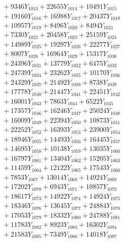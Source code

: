 \documentclass[a4paper,10pt]{article}
\begin{document}
{\begin{align}
&\;  + 9346 Y_{1013} + 22655 Y_{1014} + 10491 Y_{1015} \\[0.3ex]
&\;  + 19160 Y_{1016} + 16988 Y_{1017} + 20437 Y_{1018} \\[0.5ex]\allowbreak
&\;  + 10957 Y_{1019} + 8496 Y_{1020} + 8494 Y_{1021} \\[0.3ex]
&\;  + 7330 Y_{1022} + 20458 Y_{1023} + 25159 Y_{1024} \\[0.3ex]
&\;  + 14989 Y_{1025} + 19297 Y_{1026} + 22277 Y_{1027} \\[0.3ex]
&\;  + 8007 Y_{1028} + 16964 Y_{1029} + 15317 Y_{1030} \\[0.3ex]
&\;  + 24396 Y_{1031} + 13779 Y_{1032} + 6475 Y_{1033} \\[0.3ex]
&\;  + 24739 Y_{1034} + 23262 Y_{1035} + 10170 Y_{1036} \\[0.3ex]
&\;  + 24329 Y_{1037} + 21492 Y_{1038} + 8738 Y_{1039} \\[0.3ex]
&\;  + 17778 Y_{1040} + 21447 Y_{1041} + 22451 Y_{1042} \\[0.3ex]
&\;  + 16001 Y_{1043} + 7863 Y_{1044} + 6522 Y_{1045} \\[0.3ex]
&\;  + 17357 Y_{1046} + 16246 Y_{1047} + 25024 Y_{1048} \\[0.5ex]\allowbreak
&\;  + 16009 Y_{1049} + 22394 Y_{1050} + 10873 Y_{1051} \\[0.3ex]
&\;  + 22252 Y_{1052} + 16393 Y_{1053} + 23900 Y_{1054} \\[0.3ex]
&\;  + 18946 Y_{1055} + 14493 Y_{1056} + 16445 Y_{1057} \\[0.3ex]
&\;  + 14695 Y_{1058} + 10138 Y_{1059} + 13035 Y_{1060} \\[0.3ex]
&\;  + 16797 Y_{1061} + 13404 Y_{1062} + 15205 Y_{1063} \\[0.3ex]
&\;  + 11459 Y_{1064} + 12122 Y_{1065} + 17543 Y_{1066} \\[0.3ex]
&\;  + 7853 Y_{1067} + 13014 Y_{1068} + 14924 Y_{1069} \\[0.3ex]
&\;  + 17202 Y_{1070} + 6943 Y_{1071} + 10857 Y_{1072} \\[0.3ex]
&\;  + 18617 Y_{1073} + 14922 Y_{1074} + 14924 Y_{1075} \\[0.3ex]
&\;  + 18346 Y_{1076} + 13645 Y_{1077} + 24884 Y_{1078} \\[0.5ex]\allowbreak
&\;  + 17053 Y_{1079} + 18332 Y_{1080} + 24788 Y_{1081} \\[0.3ex]
&\;  + 11783 Y_{1082} + 8923 Y_{1083} + 16302 Y_{1084} \\[0.3ex]
&\;  + 21583 Y_{1085} + 7349 Y_{1086} + 14018 Y_{1087} \\[0.3ex]

\end{align}}
\end{document}
